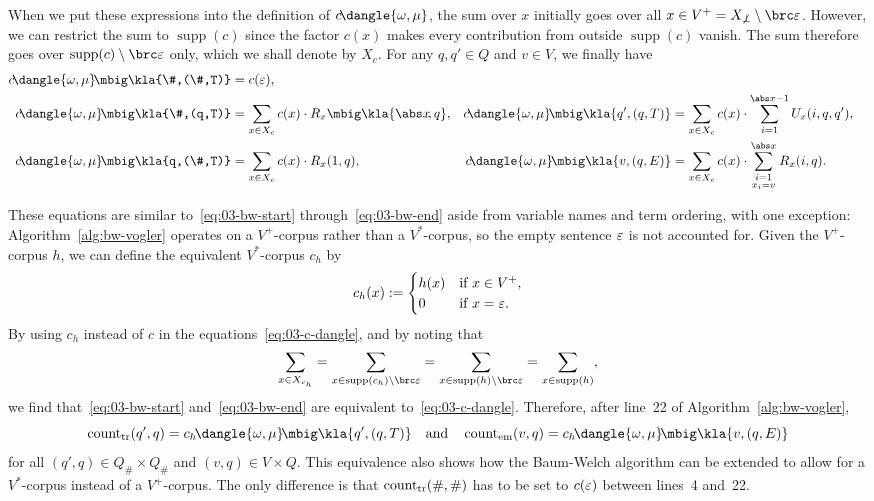 When we put these expressions into the definition of
$c\!\dangle{\omega,\mu}$, the sum over $x$ initially goes over all $x\in
V^+ = X_{\not\bot}\setminus\brc\eps$. However, we can restrict the sum to
$\operatorname{supp}(c)$ since the factor $c(x)$ makes every contribution from
outside $\operatorname{supp}(c)$ vanish. The sum therefore goes over
$\operatorname{supp}(c)\setminus\brc\eps$ only, which we shall denote by $X_c$.
For any $q,q'\in Q$ and $v\in V$, we finally have
\begin{align}\label{eq:03-c-dangle}
 c\!\dangle{\omega,\mu}\!\mbig\kla{\#,(\#,T)} &= c(\eps), \\
 c\!\dangle{\omega,\mu}\!\mbig\kla{\#,(q,T)} &= \sum_{x\in X_c} c(x) \cdot R_x\mbig\kla{\abs x\!,q}, &
 c\!\dangle{\omega,\mu}\!\mbig\kla{q',(q,T)} &= \sum_{x\in X_c} c(x) \cdot \sum_{i=1}^{\abs x-1} U_x(i,q,q'), \nonumber\\
 c\!\dangle{\omega,\mu}\!\mbig\kla{q,(\#,T)} &= \sum_{x\in X_c} c(x) \cdot R_x(1,q), &
 c\!\dangle{\omega,\mu}\!\mbig\kla{v,(q,E)} &= \sum_{x\in X_c} c(x) \cdot \sum_{{\scriptstyle i=1}\atop{\scriptstyle x_i=v}}^{\abs x} R_x(i,q). \nonumber
\end{align}

These equations are similar to~\eqref{eq:03-bw-start}
through~\eqref{eq:03-bw-end} aside from variable names and term ordering, with
one exception: Algorithm~\ref{alg:bw-vogler} operates on a $V^+$-corpus rather
than a $V^*$-corpus, so the empty sentence $\varepsilon$ is not accounted for. Given
the $V^+$-corpus $h$, we can define the equivalent $V^*$-corpus $c_h$ by
\[
 c_h(x) := \begin{cases}
  h(x) &\text{if } x\in V^+, \\
  0 & \text{if } x=\varepsilon.
 \end{cases}
\]
By using $c_h$ instead of $c$ in the equations~\eqref{eq:03-c-dangle}, and by noting that
\[
 \sum_{x\in X_{c_h}} = \sum_{x\in \operatorname{supp}(c_h)\setminus\brc\eps} = \sum_{x\in\operatorname{supp}(h)\setminus\brc\eps} = \sum_{x\in\operatorname{supp}(h)},
\]
we find that~\eqref{eq:03-bw-start} and~\eqref{eq:03-bw-end} are equivalent
to~\eqref{eq:03-c-dangle}. Therefore, after line~22 of
Algorithm~\ref{alg:bw-vogler},
\begin{equation}\label{eq:03-cnt-by-c}
 \cnt_\mathrm{tr}(q',q) = c_h\!\dangle{\omega,\mu}\!\mbig\kla{q',(q,T)}
 \quad\text{and}\quad
 \cnt_\mathrm{em}(v,q) = c_h\!\dangle{\omega,\mu}\!\mbig\kla{v,(q,E)}
\end{equation}
for all $(q',q)\in Q_\#\times Q_\#$ and $(v,q)\in V\times Q$. This equivalence
also shows how the Baum-Welch algorithm can be extended to allow for a
$V^*$-corpus instead of a $V^+$-corpus. The only difference is that
$\operatorname{count}_\mathrm{tr}(\#,\#)$ has to be set to $c(\varepsilon)$ between lines~4 and~22.

